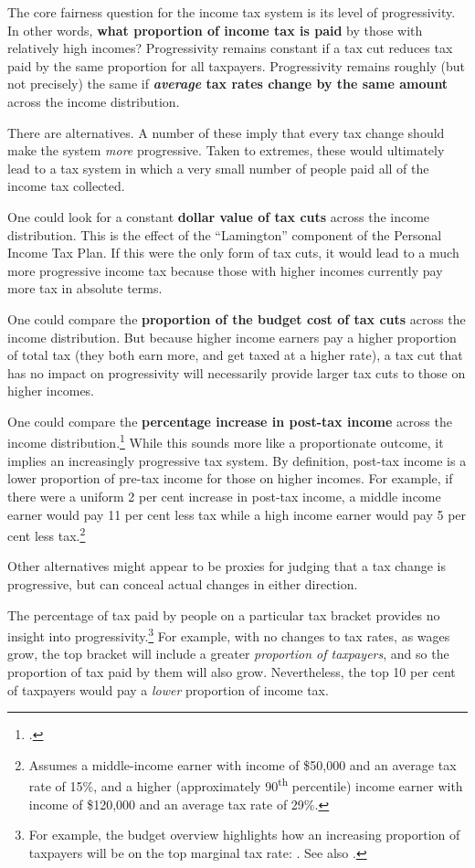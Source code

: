 \documentclass[submission]{grattan}
\begin{document}
The core fairness question for the income tax system is its level of progressivity. In other words, \textbf{what proportion of income tax is paid} by those with relatively high incomes? Progressivity remains constant if a tax cut reduces tax paid by the same proportion for all taxpayers. Progressivity remains roughly (but not precisely) the same if \textbf{\emph{average} tax rates change by the same amount} across the income distribution.

There are alternatives. A number of these imply that every tax change should make the system \emph{more} progressive. Taken to extremes, these would ultimately lead to a tax system in which a very small number of people paid all of the income tax collected.

One could look for a constant \textbf{dollar value of tax cuts} across the income distribution. This is the effect of the ``Lamington'' component of the Personal Income Tax Plan. If this were the only form of tax cuts, it would lead to a much more progressive income tax because those with higher incomes currently pay more tax in absolute terms.

One could compare the \textbf{proportion of the budget cost of tax cuts} across the income distribution.
But because higher income earners pay a higher proportion of total tax (they both earn more, and get taxed at a higher rate), a tax cut that has no impact on progressivity will necessarily provide larger tax cuts to those on higher incomes.

One could compare the \textbf{percentage increase in post-tax income} across the income distribution.\footcite[][11]{Phillips2018}
While this sounds more like a proportionate outcome, it implies an increasingly progressive tax system. By definition, post-tax income is a lower proportion of pre-tax income for those on higher incomes. For example, if there were a uniform 2 per cent increase in post-tax income, a middle income earner would pay 11 per cent less tax while a high income earner would pay 5 per cent less tax.\footnote{Assumes a middle-income earner with income of \$50,000 and an average tax rate of 15\%, and a higher (approximately 90\textsuperscript{th} percentile) income earner with income of \$120,000 and an average tax rate of 29\%.}

Other alternatives might appear to be proxies for judging that a tax change is progressive, but can conceal actual changes in either direction.

The percentage of tax paid by people on a particular tax bracket provides no insight into progressivity.\footnote{For example, the budget overview highlights how an increasing proportion of taxpayers will be on the top marginal tax rate: \textcite[][9]{Treasury2018b}. See also \textcite[][7--8]{Treasury2018c}.}
For example, with no changes to tax rates, as wages grow, the top bracket will include a greater \emph{proportion of taxpayers}, and so the proportion of tax paid by them will also grow. Nevertheless, the top 10 per cent of taxpayers would pay a \emph{lower} proportion of income tax.
\end{document}
